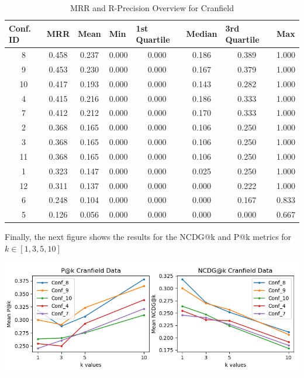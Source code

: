 \documentclass[12pt]{article}
\begin{document}
\begin{table}[H]
\centering
\begin{tabular}{|c|c|c|c|c|c|c|c|}
\hline
\multicolumn{1}{|l|}{\textbf{Conf. ID}} &
  \multicolumn{1}{l|}{\textbf{MRR}} &
  \multicolumn{1}{l|}{\textbf{Mean}} &
  \multicolumn{1}{l|}{\textbf{Min}} &
  \multicolumn{1}{l|}{\textbf{1st Quartile}} &
  \multicolumn{1}{l|}{\textbf{Median}} &
  \multicolumn{1}{l|}{\textbf{3rd Quartile}} &
  \multicolumn{1}{l|}{\textbf{Max}} \\ \hline
8  & 0.458 & 0.237 & 0.000 & 0.000 & 0.186 & 0.389 & 1.000 \\ \hline
9  & 0.453 & 0.230 & 0.000 & 0.000 & 0.167 & 0.379 & 1.000 \\ \hline
10 & 0.417 & 0.193 & 0.000 & 0.000 & 0.143 & 0.282 & 1.000 \\ \hline
4  & 0.415 & 0.216 & 0.000 & 0.000 & 0.186 & 0.333 & 1.000 \\ \hline
7  & 0.412 & 0.212 & 0.000 & 0.000 & 0.170 & 0.333 & 1.000 \\ \hline
2  & 0.368 & 0.165 & 0.000 & 0.000 & 0.106 & 0.250 & 1.000 \\ \hline
3  & 0.368 & 0.165 & 0.000 & 0.000 & 0.106 & 0.250 & 1.000 \\ \hline
11 & 0.368 & 0.165 & 0.000 & 0.000 & 0.106 & 0.250 & 1.000 \\ \hline
1  & 0.323 & 0.147 & 0.000 & 0.000 & 0.025 & 0.250 & 1.000 \\ \hline
12 & 0.311 & 0.137 & 0.000 & 0.000 & 0.000 & 0.222 & 1.000 \\ \hline
6  & 0.248 & 0.104 & 0.000 & 0.000 & 0.000 & 0.167 & 0.833 \\ \hline
5  & 0.126 & 0.056 & 0.000 & 0.000 & 0.000 & 0.000 & 0.667 \\ \hline
\end{tabular}
\caption{MRR and R-Precision Overview for Cranfield}
\label{tab:my-table}
\end{table}

Finally, the next figure shows the results for the NCDG@k and P@k metrics for $k \in [1, 3, 5, 10]$

\begin{center}
\includegraphics[scale=.75]{CranPlot.png}
\end{center}
\end{document}
